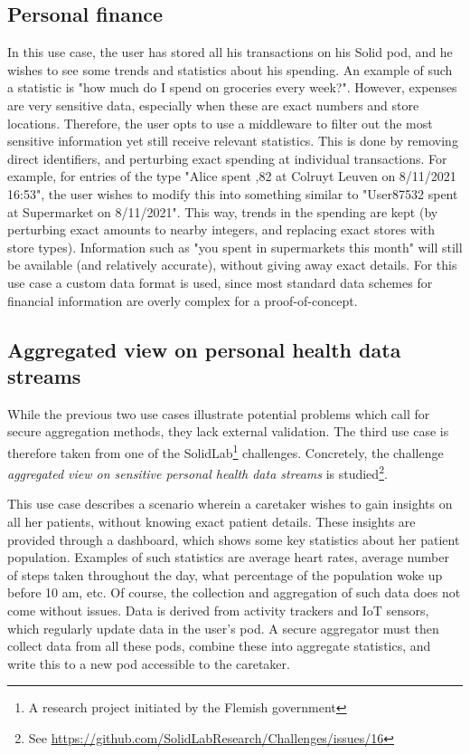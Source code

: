 \subsection{Personal finance}
\label{usecase:personal-finance}
In this use case, the user has stored all his transactions on his Solid pod, and he wishes to see some trends and statistics about his spending. An example of such a statistic is "how much do I spend on groceries every week?".  However, expenses are very sensitive data, especially when these are exact numbers and store locations. Therefore, the user opts to use a middleware to filter out the most sensitive information yet still receive relevant statistics. This is done by removing direct identifiers, and perturbing exact spending at individual transactions. For example, for entries of the type "Alice spent ,82 at Colruyt Leuven on 8/11/2021 16:53", the user wishes to modify this into something similar to "User87532 spent  at Supermarket on 8/11/2021". This way, trends in the spending are kept (by perturbing exact amounts to nearby integers, and replacing exact stores with store types). Information such as "you spent  in supermarkets this month" will still be available (and relatively accurate), without giving away exact details. For this use case a custom data format is used, since most standard data schemes for financial information are overly complex for a proof-of-concept.

\subsection{Aggregated view on personal health data streams}
While the previous two use cases illustrate potential problems which call for secure aggregation methods, they lack external validation. The third use case is therefore taken from one of the SolidLab\footnote{A research project initiated by the Flemish government } challenges. Concretely, the challenge \textit{aggregated view on sensitive personal health data streams} is studied\footnote{See \url{https://github.com/SolidLabResearch/Challenges/issues/16}}.

This use case describes a scenario wherein a caretaker wishes to gain insights on all her patients, without knowing exact patient details. These insights are provided through a dashboard, which shows some key statistics about her patient population. Examples of such statistics are average heart rates, average number of steps taken throughout the day, what percentage of the population woke up before 10 am, etc. Of course, the collection and aggregation of such data does not come without issues. Data is derived from activity trackers and IoT sensors, which regularly update data in the user's pod. A secure aggregator must then collect data from all these pods, combine these into aggregate statistics, and write this to a new pod accessible to the caretaker.

